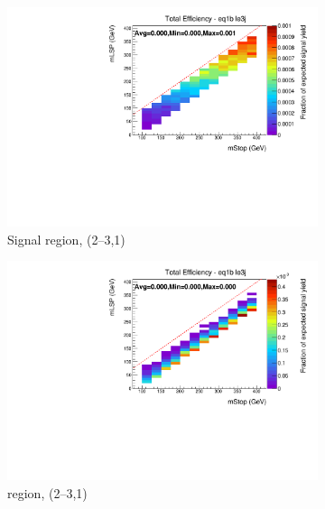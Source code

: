 \begin{figure}[ht!]
\begin{subfigure}[b]{0.47\textwidth}
    \includegraphics[width=\textwidth, trim=0 0 0 24, clip=true]{Figs/sms/t2degen/v5/T2_4body_v5_had_eff_maps_eq1b_le3j_SITV.pdf}
    \caption{Signal region, (2--3,1)}
    \label{fig:t2_4body_sig_eff_le3j_1b}
  \end{subfigure}
  \begin{subfigure}[b]{0.47\textwidth}
    \includegraphics[width=\textwidth, trim=0 0 0 24, clip=true]{Figs/sms/t2degen/v5/T2_4body_v5_muon_eff_maps_eq1b_le3j_SITV.pdf}
    \caption{\mj region, (2--3,1)}
    \label{fig:t2_4body_mu_eff_le3j_1b}
  \end{subfigure} \\
  \begin{subfigure}[b]{0.47\textwidth}

\end{subfigure}
\end{figure}

